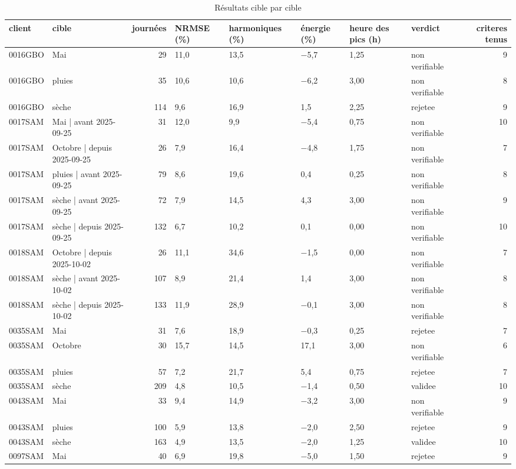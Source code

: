 \begin{table}[htbp]
\caption{Résultats cible par cible}
\label{tab:resultats_par_cible}
\begin{tabular}{llrlllllr}
\toprule
client & cible & journées & NRMSE (\%) & harmoniques (\%) & énergie (\%) & heure des pics (h) & verdict & criteres tenus \\
\midrule
0016GBO & Mai & 29 & 11,0 & 13,5 & −5,7 & 1,25 & non verifiable & 9 \\
0016GBO & pluies & 35 & 10,6 & 10,6 & −6,2 & 3,00 & non verifiable & 8 \\
0016GBO & sèche & 114 & 9,6 & 16,9 & 1,5 & 2,25 & rejetee & 9 \\
0017SAM & Mai | avant 2025-09-25 & 31 & 12,0 & 9,9 & −5,4 & 0,75 & non verifiable & 10 \\
0017SAM & Octobre | depuis 2025-09-25 & 26 & 7,9 & 16,4 & −4,8 & 1,75 & non verifiable & 7 \\
0017SAM & pluies | avant 2025-09-25 & 79 & 8,6 & 19,6 & 0,4 & 0,25 & non verifiable & 8 \\
0017SAM & sèche | avant 2025-09-25 & 72 & 7,9 & 14,5 & 4,3 & 3,00 & non verifiable & 9 \\
0017SAM & sèche | depuis 2025-09-25 & 132 & 6,7 & 10,2 & 0,1 & 0,00 & non verifiable & 10 \\
0018SAM & Octobre | depuis 2025-10-02 & 26 & 11,1 & 34,6 & −1,5 & 0,00 & non verifiable & 7 \\
0018SAM & sèche | avant 2025-10-02 & 107 & 8,9 & 21,4 & 1,4 & 3,00 & non verifiable & 8 \\
0018SAM & sèche | depuis 2025-10-02 & 133 & 11,9 & 28,9 & −0,1 & 3,00 & non verifiable & 8 \\
0035SAM & Mai & 31 & 7,6 & 18,9 & −0,3 & 0,25 & rejetee & 7 \\
0035SAM & Octobre & 30 & 15,7 & 14,5 & 17,1 & 3,00 & non verifiable & 6 \\
0035SAM & pluies & 57 & 7,2 & 21,7 & 5,4 & 0,75 & rejetee & 7 \\
0035SAM & sèche & 209 & 4,8 & 10,5 & −1,4 & 0,50 & validee & 10 \\
0043SAM & Mai & 33 & 9,4 & 14,9 & −3,2 & 3,00 & non verifiable & 9 \\
0043SAM & pluies & 100 & 5,9 & 13,8 & −2,0 & 2,50 & rejetee & 9 \\
0043SAM & sèche & 163 & 4,9 & 13,5 & −2,0 & 1,25 & validee & 10 \\
0097SAM & Mai & 40 & 6,9 & 19,8 & −5,0 & 1,50 & rejetee & 9 \\

\end{tabular}
\end{table}

